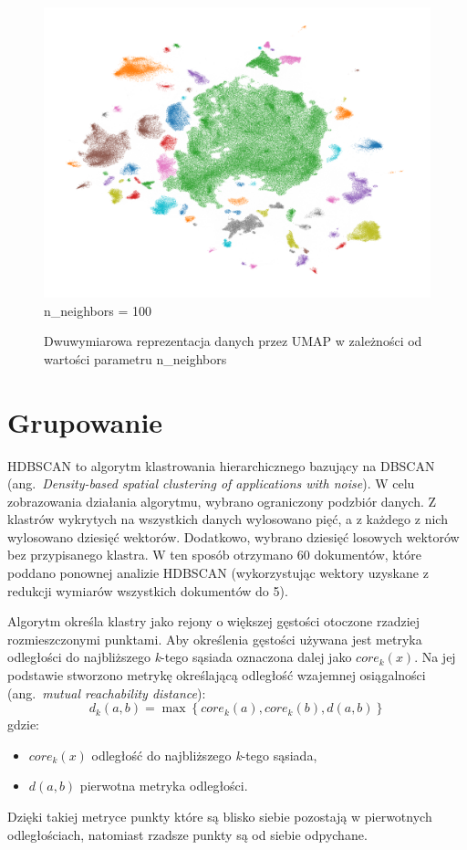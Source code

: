 \begin{figure}[htb]
\begin{minipage}{.33\textwidth}
			\includegraphics[width=\linewidth]{rys04/umap_100_100_100.png}
			n\_neighbors = 100
		\end{minipage}
		\caption{Dwuwymiarowa reprezentacja danych przez UMAP w zależności od wartości parametru n\_neighbors}\label{fig:umap}
	\end{figure}
	

\section{Grupowanie}
	HDBSCAN to algorytm klastrowania hierarchicznego bazujący na DBSCAN (ang.\ \emph{Density-based spatial clustering of applications with noise}).
	W celu zobrazowania działania algorytmu, wybrano ograniczony podzbiór danych.
	Z klastrów wykrytych na wszystkich danych wylosowano pięć, a z każdego z nich wylosowano dziesięć wektorów.
	Dodatkowo, wybrano dziesięć losowych wektorów bez przypisanego klastra.
	W ten sposób otrzymano 60 dokumentów, które poddano ponownej analizie HDBSCAN
		(wykorzystując wektory uzyskane z redukcji wymiarów wszystkich dokumentów do 5).
	
	Algorytm określa klastry jako rejony o większej gęstości otoczone rzadziej rozmieszczonymi punktami.
	Aby określenia gęstości używana jest metryka odległości do najbliższego \emph{k}-tego sąsiada oznaczona dalej jako \(core_k(x)\).
	Na jej podstawie stworzono metrykę określającą odległość wzajemnej osiągalności (ang.\ \emph{mutual reachability distance}):
	\[ d_k(a,b) = \max \left\lbrace core_k(a),core_k(b),d(a,b) \right\rbrace \]
	gdzie:
	\begin{itemize}
		\item \(core_k(x)\) odległość do najbliższego \emph{k}-tego sąsiada,
		\item \(d(a,b)\) pierwotna metryka odległości.
	\end{itemize}
	Dzięki takiej metryce punkty które są blisko siebie pozostają w pierwotnych odległościach, natomiast rzadsze punkty są od siebie odpychane.

